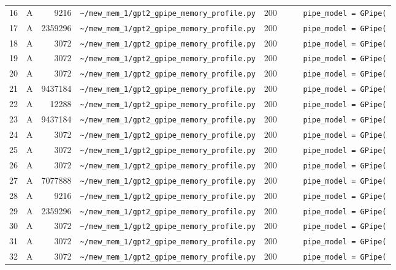 \documentclass{article}
\begin{document}
\begin{longtable}{r l r p{6.5cm} r p{7.0cm}}
16 & A & 9216 & \lstinline|~/mew_mem_1/gpt2_gpipe_memory_profile.py| & 200 & \lstinline|    pipe_model = GPipe(| \\
17 & A & 2359296 & \lstinline|~/mew_mem_1/gpt2_gpipe_memory_profile.py| & 200 & \lstinline|    pipe_model = GPipe(| \\
18 & A & 3072 & \lstinline|~/mew_mem_1/gpt2_gpipe_memory_profile.py| & 200 & \lstinline|    pipe_model = GPipe(| \\
19 & A & 3072 & \lstinline|~/mew_mem_1/gpt2_gpipe_memory_profile.py| & 200 & \lstinline|    pipe_model = GPipe(| \\
20 & A & 3072 & \lstinline|~/mew_mem_1/gpt2_gpipe_memory_profile.py| & 200 & \lstinline|    pipe_model = GPipe(| \\
21 & A & 9437184 & \lstinline|~/mew_mem_1/gpt2_gpipe_memory_profile.py| & 200 & \lstinline|    pipe_model = GPipe(| \\
22 & A & 12288 & \lstinline|~/mew_mem_1/gpt2_gpipe_memory_profile.py| & 200 & \lstinline|    pipe_model = GPipe(| \\
23 & A & 9437184 & \lstinline|~/mew_mem_1/gpt2_gpipe_memory_profile.py| & 200 & \lstinline|    pipe_model = GPipe(| \\
24 & A & 3072 & \lstinline|~/mew_mem_1/gpt2_gpipe_memory_profile.py| & 200 & \lstinline|    pipe_model = GPipe(| \\
25 & A & 3072 & \lstinline|~/mew_mem_1/gpt2_gpipe_memory_profile.py| & 200 & \lstinline|    pipe_model = GPipe(| \\
26 & A & 3072 & \lstinline|~/mew_mem_1/gpt2_gpipe_memory_profile.py| & 200 & \lstinline|    pipe_model = GPipe(| \\
27 & A & 7077888 & \lstinline|~/mew_mem_1/gpt2_gpipe_memory_profile.py| & 200 & \lstinline|    pipe_model = GPipe(| \\
28 & A & 9216 & \lstinline|~/mew_mem_1/gpt2_gpipe_memory_profile.py| & 200 & \lstinline|    pipe_model = GPipe(| \\
29 & A & 2359296 & \lstinline|~/mew_mem_1/gpt2_gpipe_memory_profile.py| & 200 & \lstinline|    pipe_model = GPipe(| \\
30 & A & 3072 & \lstinline|~/mew_mem_1/gpt2_gpipe_memory_profile.py| & 200 & \lstinline|    pipe_model = GPipe(| \\
31 & A & 3072 & \lstinline|~/mew_mem_1/gpt2_gpipe_memory_profile.py| & 200 & \lstinline|    pipe_model = GPipe(| \\
32 & A & 3072 & \lstinline|~/mew_mem_1/gpt2_gpipe_memory_profile.py| & 200 & \lstinline|    pipe_model = GPipe(| \\

\end{longtable}
\end{document}
